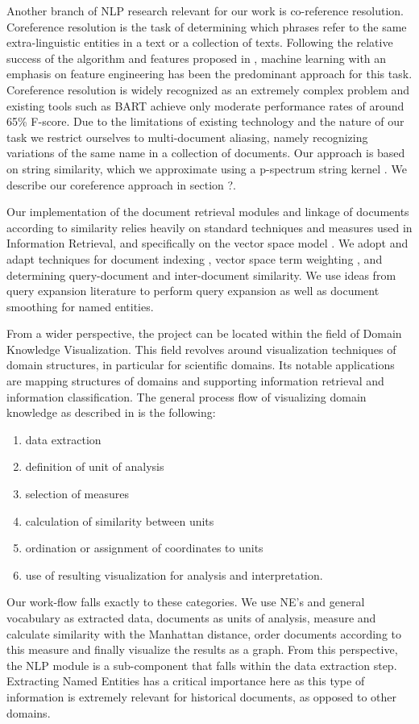 Another branch of NLP research relevant for our work is co-reference resolution. 
Coreference resolution is the task of determining which phrases refer to the same extra-linguistic entities in a text or a collection of texts.
Following the relative success of the algorithm and features proposed in \cite {soon2001coreference}, machine learning 
with an emphasis on feature engineering has been the predominant approach for this task. Coreference resolution is widely 
recognized as an extremely complex problem and existing tools such as BART \cite{bart} achieve only moderate performance rates 
of around 65\% F-score. Due to the limitations of existing technology and the nature of our task we restrict ourselves to multi-document 
aliasing, namely recognizing variations of the same name in a collection of documents. Our approach is based on string similarity, 
which we approximate using a p-spectrum string kernel \cite{kernels2004}. We describe our coreference approach in section ?.

Our implementation of the document retrieval modules and linkage of documents according to similarity relies heavily on standard techniques 
and measures used in Information Retrieval, and  specifically on the vector space model \cite{ir2008}. We adopt and adapt techniques for 
document indexing \cite{indexing1999}, vector space term weighting \cite{jones2004}, \cite{salton1971} and determining query-document and 
inter-document similarity. We use ideas from query expansion literature \cite{xu1996} to perform query expansion 
as well as document smoothing for named entities. 

From a wider perspective, the project can be located within the field of Domain Knowledge Visualization. This field revolves around visualization
techniques of domain structures, in particular for scientific domains. Its notable applications are mapping structures of domains and supporting
information retrieval and information classification.
The general process flow of visualizing domain knowledge as described in
\cite{visualizing2003} is the following: 
\begin{enumerate}
\item data extraction 
\item definition of unit of analysis 
\item selection of measures 
\item calculation of similarity between units 
\item ordination or assignment of coordinates to units 
\item use of resulting visualization for analysis and interpretation.
\end{enumerate}
Our work-flow falls exactly to these categories. We use NE's and general vocabulary as extracted data, documents as units of analysis, measure and calculate similarity with the Manhattan distance, order documents according to this measure and finally visualize the results as a graph.
From this perspective, the NLP module is a sub-component that falls within the data extraction step. Extracting Named Entities has a critical importance
here as this type of information is extremely relevant for historical documents, as opposed to other domains.  

